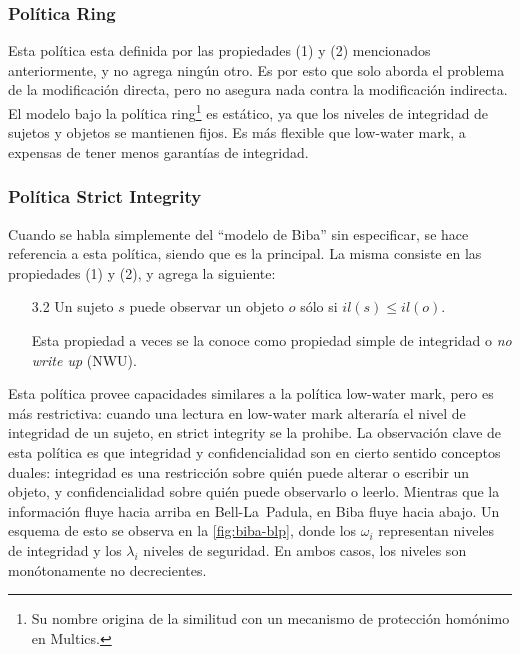 \documentclass[spanish]{article}
\theoremstyle{definition}
\begin{document}
\subsubsection*{Política Ring}
Esta política esta definida por las propiedades (1) y (2) mencionados
anteriormente, y no agrega ningún otro. Es por esto que solo aborda el problema
de la modificación directa, pero no asegura nada contra la modificación
indirecta. El modelo bajo la política ring\footnote{Su nombre origina de la
similitud con un mecanismo de protección homónimo en Multics.} es estático, ya
que los niveles de integridad de sujetos y objetos se mantienen fijos. Es más
flexible que low-water mark, a expensas de tener menos garantías de integridad.

\subsubsection*{Política Strict Integrity}

Cuando se habla simplemente del ``modelo de Biba'' sin especificar, se hace
referencia a esta política, siendo que es la principal. La misma consiste en las
propiedades (1) y (2), y agrega la siguiente:
\begin{itemize}
  \item[3.2] Un sujeto $s$ puede observar un objeto $o$ sólo si $il(s) \leq il(o)$.

    Esta propiedad a veces se la conoce como propiedad simple de integridad o
    \textit{no write up} (NWU).
  \end{itemize}
Esta política provee capacidades similares a la política low-water mark, pero es
más restrictiva: cuando una lectura en low-water mark alteraría el nivel de
integridad de un sujeto, en strict integrity se la prohibe. La observación clave
de esta política es que integridad y confidencialidad son en cierto sentido
conceptos duales: integridad es una restricción sobre quién puede alterar o
escribir un objeto, y confidencialidad sobre quién puede observarlo o leerlo.
Mientras que la información fluye hacia arriba en Bell-La~Padula, en Biba fluye
hacia abajo. Un esquema de esto se observa en la \autoref{fig:biba-blp}, donde
los $\omega_i$ representan niveles de integridad y los $\lambda_i$ niveles de
seguridad. En ambos casos, los niveles son monótonamente no decrecientes.
\end{document}

